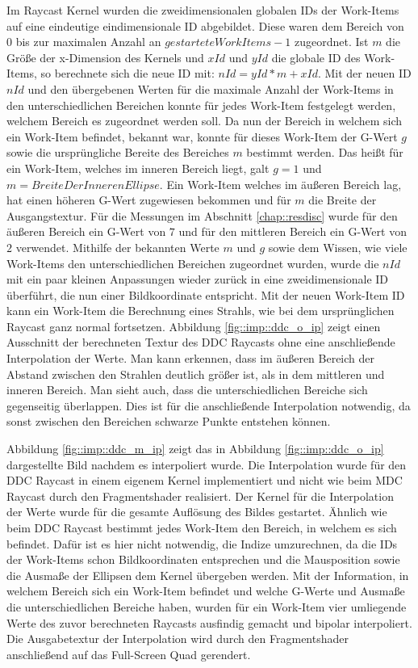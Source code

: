 Im Raycast Kernel wurden die zweidimensionalen globalen IDs der Work-Items auf eine eindeutige eindimensionale ID abgebildet.
Diese waren dem Bereich von $0$ bis zur maximalen Anzahl an $gestarteteWorkItems-1$ zugeordnet.
Ist $m$ die Größe der x-Dimension des Kernels und $xId$ und $yId$ die globale ID des Work-Items, so berechnete sich die neue ID mit: $nId = yId * m + xId$.
Mit der neuen ID $nId$ und den übergebenen Werten für die maximale Anzahl der Work-Items in den unterschiedlichen Bereichen konnte für jedes Work-Item festgelegt werden, welchem Bereich es zugeordnet werden soll.
Da nun der Bereich in welchem sich ein Work-Item befindet, bekannt war, konnte für dieses Work-Item der G-Wert $g$ sowie die ursprüngliche Bereite des Bereiches $m$ bestimmt werden.
Das heißt für ein Work-Item, welches im inneren Bereich liegt, galt $g=1$ und $m=BreiteDerInnerenEllipse$.
Ein Work-Item welches im äußeren Bereich lag, hat einen höheren G-Wert zugewiesen bekommen und für $m$ die Breite der Ausgangstextur.
Für die Messungen im Abschnitt \ref{chap::resdisc} wurde für den äußeren Bereich ein G-Wert von $7$ und für den mittleren Bereich ein G-Wert von $2$ verwendet.
Mithilfe der bekannten Werte $m$ und $g$ sowie dem Wissen, wie viele Work-Items den unterschiedlichen Bereichen zugeordnet wurden, wurde die $nId$ mit ein paar kleinen Anpassungen wieder zurück in eine zweidimensionale ID überführt, die nun einer Bildkoordinate entspricht.
Mit der neuen Work-Item ID kann ein Work-Item die Berechnung eines Strahls, wie bei dem ursprünglichen Raycast ganz normal fortsetzen.
Abbildung \ref{fig::imp::ddc_o_ip} zeigt einen Ausschnitt der berechneten Textur des DDC Raycasts ohne eine anschließende Interpolation der Werte.
Man kann erkennen, dass im äußeren Bereich der Abstand zwischen den Strahlen deutlich größer ist, als in dem mittleren und inneren Bereich.
Man sieht auch, dass die unterschiedlichen Bereiche sich gegenseitig überlappen.
Dies ist für die anschließende Interpolation notwendig, da sonst zwischen den Bereichen schwarze Punkte entstehen können.

Abbildung \ref{fig::imp::ddc_m_ip} zeigt das in Abbildung \ref{fig::imp::ddc_o_ip} dargestellte Bild nachdem es interpoliert wurde.
Die Interpolation wurde für den DDC Raycast in einem eigenem Kernel implementiert und nicht wie beim MDC Raycast durch den Fragmentshader realisiert.
Der Kernel für die Interpolation der Werte wurde für die gesamte Auflösung des Bildes gestartet.
Ähnlich wie beim DDC Raycast bestimmt jedes Work-Item den Bereich, in welchem es sich befindet.
Dafür ist es hier nicht notwendig, die Indize umzurechnen, da die IDs der Work-Items schon Bildkoordinaten entsprechen und die Mausposition sowie die Ausmaße der Ellipsen dem Kernel übergeben werden.
Mit der Information, in welchem Bereich sich ein Work-Item befindet und welche G-Werte und Ausmaße die unterschiedlichen Bereiche haben, wurden für ein Work-Item vier umliegende Werte des zuvor berechneten Raycasts ausfindig gemacht und bipolar interpoliert.
Die Ausgabetextur der Interpolation wird durch den Fragmentshader anschließend auf das Full-Screen Quad gerendert.

